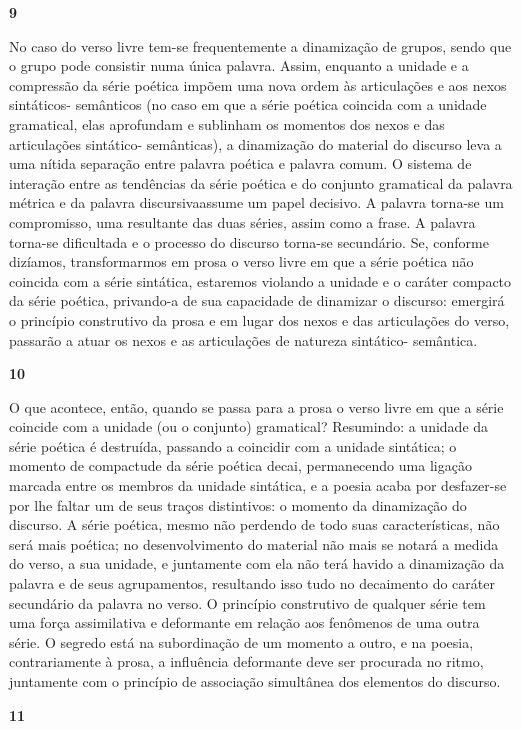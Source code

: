 \textbf{9}

No caso do verso livre tem-se frequentemente a dinamização de grupos,
sendo que o grupo pode consistir numa única palavra. Assim, enquanto a
unidade e a compressão da série poética impõem uma nova ordem às
articulações e aos nexos sintáticos- semânticos (no caso em que a série
poética coincida com a unidade gramatical, elas aprofundam e sublinham
os momentos dos nexos e das articulações sintático- semânticas), a
dinamização do material do discurso leva a uma nítida separação entre
palavra poética e palavra comum. O sistema de interação entre as
tendências da série poética e do conjunto gramatical da palavra métrica
e da palavra discursivaassume um papel decisivo. A palavra torna-se um
compromisso, uma resultante das duas séries, assim como a frase. A
palavra torna-se dificultada e o processo do discurso torna-se
secundário. Se, conforme dizíamos, transformarmos em prosa o verso livre
em que a série poética não coincida com a série sintática, estaremos
violando a unidade e o caráter compacto da série poética, privando-a de
sua capacidade de dinamizar o discurso: emergirá o princípio construtivo
da prosa e em lugar dos nexos e das articulações do verso, passarão a
atuar os nexos e as articulações de natureza sintático- semântica.

\textbf{10}

O que acontece, então, quando se passa para a prosa o verso livre em que
a série coincide com a unidade (ou o conjunto) gramatical? Resumindo: a
unidade da série poética é destruída, passando a coincidir com a unidade
sintática; o momento de compactude da série poética decai, permanecendo
uma ligação marcada entre os membros da unidade sintática, e a poesia
acaba por desfazer-se por lhe faltar um de seus traços distintivos: o
momento da dinamização do discurso. A série poética, mesmo não perdendo
de todo suas características, não será mais poética; no desenvolvimento
do material não mais se notará a medida do verso, a sua unidade, e
juntamente com ela não terá havido a dinamização da palavra e de seus
agrupamentos, resultando isso tudo no decaimento do caráter secundário
da palavra no verso. O princípio construtivo de qualquer série tem uma
força assimilativa e deformante em relação aos fenômenos de uma outra
série. O segredo está na subordinação de um momento a outro, e na
poesia, contrariamente à prosa, a influência deformante deve ser
procurada no ritmo, juntamente com o princípio de associação simultânea
dos elementos do discurso.

\textbf{11}

